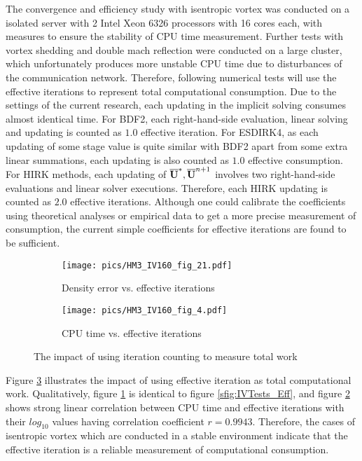 \documentclass[preprint,12pt]{elsarticle}
\begin{document}
The convergence and efficiency study with isentropic vortex was 
conducted on a isolated server with 2 Intel Xeon 6326 processors with 
16 cores each, with measures to ensure the stability of CPU time measurement.
Further tests with vortex shedding and double mach reflection 
were conducted on a large cluster, which unfortunately produces more
unstable CPU time due to disturbances of the communication network.
Therefore, following numerical tests will use the effective iterations 
to represent total computational consumption.
Due to the settings of the current research, each updating in 
the implicit solving consumes almost identical time.
For BDF2, each right-hand-side evaluation, linear solving and updating 
is counted as $1.0$ effective iteration. 
For ESDIRK4, as each updating of some stage value is quite similar with 
BDF2 apart from some extra linear summations, each updating is also 
counted as $1.0$ effective consumption. 
For HIRK methods, each updating of $\overline{\mathbf{U}}^*,\overline{\mathbf{U}}^{n+1}$ 
involves two right-hand-side evaluations and linear solver executions.
Therefore, each HIRK updating is counted as $2.0$ effective iterations.
Although one could calibrate the coefficients using theoretical analyses or 
empirical data to get a more precise measurement of consumption, 
the current simple coefficients for effective iterations are found to 
be sufficient.

\begin{figure}[htbp]
    \centering
    \begin{subfigure}{0.5\textwidth}
        \texttt{[image: pics/HM3\_IV160\_fig\_21.pdf]}
        \caption[]{Density error vs. effective iterations }
        \label{sfig:IVTests2_EffIt}
    \end{subfigure}\hfill
    \begin{subfigure}{0.5\textwidth}
        \texttt{[image: pics/HM3\_IV160\_fig\_4.pdf]}
        \caption[]{CPU time vs. effective iterations}
        \label{sfig:IVTests2_CPUVEffIt}
    \end{subfigure}
    \caption[]{The impact of using iteration counting to measure total work}
    \label{fig:IVTests2}
\end{figure}

Figure \ref{fig:IVTests2} illustrates the impact of using effective iteration
as total computational work. Qualitatively, figure \ref{sfig:IVTests2_EffIt}
is identical to figure \ref{sfig:IVTests_Eff}, 
and figure  \ref{sfig:IVTests2_CPUVEffIt} shows strong linear correlation 
between CPU time and effective iterations with their 
$log_{10}$ values having correlation coefficient $r=0.9943$. 
Therefore, the cases of isentropic vortex which are conducted in 
a stable environment indicate that the effective iteration is 
a reliable measurement of computational consumption.
\end{document}
